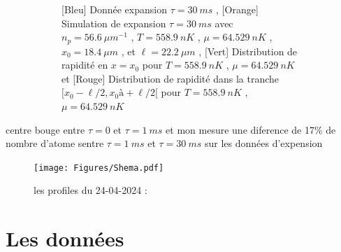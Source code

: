 \documentclass[a3, 10pt,twoside]{article}          %
\theoremstyle{plain}
\theoremstyle{definition}
\theoremstyle{remark}
\theoremstyle{definition} %
\def\OliveGreen{OliveGreen}
\begin{document}
\begin{figure}[h]
\begin{subfigure}[b]{0.45\textwidth}
        		\caption{{\color{blue}[Bleu] Donnée  expansion $\tau = 30~ms$} , {\color{orange}[Orange] Simulation de  expansion $\tau = 30~ms$ avec $n_p = 56.6 ~{\mu m}^{-1}$ , $T = 558.9 ~nK$ , $\mu= 64.529 ~nK$ , $x_0 = 18.4~\mu m$ , et $\ell = 22.2~\mu m$} ,  {\color{\OliveGreen}[Vert] Distribution de rapidité en $x = x_0$ pour  $T = 558.9 ~nK$ , $\mu= 64.529 ~nK$} et {\color{red}[Rouge] Distribution de rapidité dans la tranche  $[x_0 - \ell/2 , x_0à + \ell/2 [ $ pour  $T = 558.9 ~nK$ , $\mu= 64.529 ~nK$}}
        		\label{fig:expansion_30_22}
    		\end{subfigure}
    		\caption{}
			\label{}	
		\end{figure}
	
	{\color{blue} centre bouge entre $\tau = 0$ et $\tau = 1~ms$ et mon mesure une diference de 17$\%$ de nombre d'atome sentre $\tau = 1~ms$ et $\tau = 30 ~ms$ sur les données d'expension}
	
	
	
	
	
	
	
	\begin{figure}[h]
        \centering
		\texttt{[image: Figures/Shema.pdf]}
	\caption{les profiles du 24-04-2024 : }
        \label{fig:donnes}
    \end{figure}
    
    
    
	\section{Les données } 
	
\end{document}
